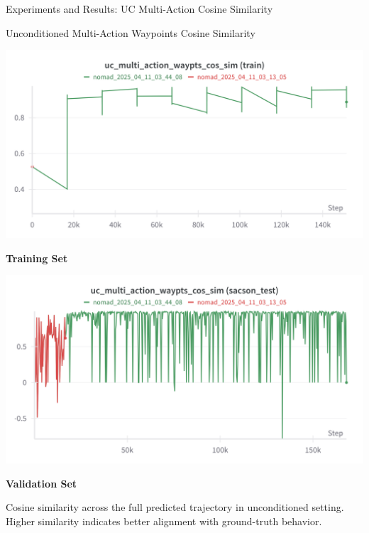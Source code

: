 \documentclass{beamer}
\begin{document}
    \begin{frame}{Experiments and Results: UC Multi-Action Cosine Similarity}
        \begin{block}{Unconditioned Multi-Action Waypoints Cosine Similarity}
            \begin{minipage}{0.48\textwidth}
                \centering
                \includegraphics[width=\textwidth]{images/cs_multi_action_cos_train.png}
                
                \textbf{Training Set}
            \end{minipage}
            \hfill
            \begin{minipage}{0.48\textwidth}
                \centering
                \includegraphics[width=\textwidth]{images/uc_multi_action_sim_test.png}
                
                \textbf{Validation Set}
            \end{minipage}
            
            \vspace{0.5em}
            \bigskip
            Cosine similarity across the full predicted trajectory in unconditioned setting. Higher similarity indicates better alignment with ground-truth behavior.
        \end{block}
    \end{frame}
\end{document}
